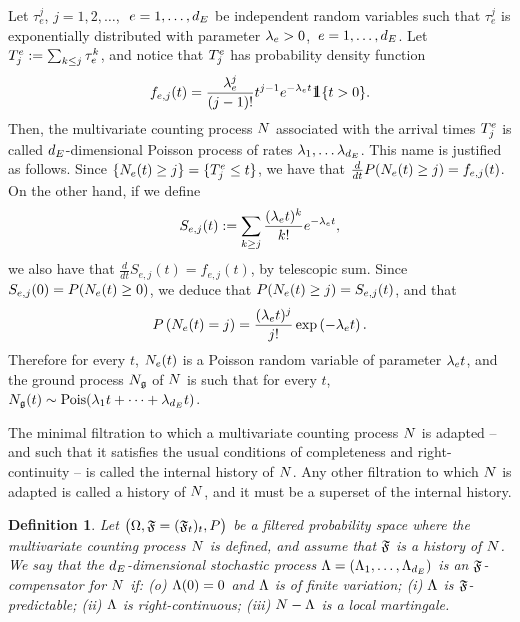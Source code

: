 \documentclass[10pt]{article}
\newtheorem{defi}[thm]{Definition}
\begin{document}
\begin{example}
 Let $\tau_e^j$, $j=1,2,\dots$, $\, \, e=1,\dots, \numEventTypes$ be independent random variables such that $\tau_e^j$ is exponentially distributed with parameter $\intensity>0$, $\, e=1,\dots, \numEventTypes$. Let $\arrivalTimes_{j} := \sum_{k\leq j} \tau_e^{k}$, and notice that $\arrivalTimes_{j}$ has probability density function 
 \begin{equation*}
  f_{e,j}(t) = \frac{\intensity^j}{(j-1)!}t^{j-1} e^{-\intensity t} \one\lbrace t>0\rbrace.
 \end{equation*}
 Then, the multivariate counting process $\multiCountingProc$ associated with the arrival times $\arrivalTimes_{j}$ is called $\numEventTypes$-dimensional Poisson process of rates $\intensity[1], \dots \intensity[\numEventTypes]$. This name is justified as follows. 
 Since $\lbrace \countingProc(t)\geq j\rbrace = \lbrace \arrivalTimes_{j} \leq t\rbrace$, we have that $\frac{d}{dt} \Prob(\countingProc(t) \geq j) = f_{e,j} (t)$. On the other hand, if we define 
 \begin{equation*}
  S_{e,j}(t) := \sum_{k\geq j} \frac{(\intensity t)^k}{k!}e^{-\intensity t},
 \end{equation*}
we also have that $\frac{d}{dt} S_{e,j}(t) = f_{e,j}(t)$, by telescopic sum. Since $S_{e,j}(0) = \Prob (\countingProc(t)\geq 0)$, we deduce that $\Prob(\countingProc(t) \geq j) = S_{e,j}(t)$, and that
\begin{equation*}
 \Prob\left( \countingProc(t) = j\right) = 
 \frac{(\intensity t)^j}{j!} \exp\left( -\intensity t\right).
\end{equation*}
Therefore for every $t$, $\countingProc(t)$ is a Poisson random variable of parameter $\intensity t$, and the ground process $\groundProc$ of $\multiCountingProc$ is such that for every $t$, $\groundProc(t) \sim \text{Pois}(\intensity[1]t + \dots + \intensity[\numEventTypes]t)$.
\end{example}

The minimal filtration to which a multivariate counting process $\multiCountingProc$ is adapted -- and such that it satisfies the usual conditions of completeness and right-continuity -- is called the internal history of $\multiCountingProc$. Any other filtration to which $\multiCountingProc$ is adapted is called a history of $\multiCountingProc$, and it must be a superset of the internal history. 

\begin{defi}\label{def.compensator}
 Let $\stochasticBase$ be a filtered probability space where the multivariate counting process $\multiCountingProc$ is defined, and assume that $\filtrationF$ is a history of $\multiCountingProc$. We say that the $\numEventTypes$-dimensional stochastic process $\compensator = (\compensator_1, \dots , \compensator_{\numEventTypes})$ is an $\filtrationF$-compensator for $\multiCountingProc$ if: (o) $\compensator(0)=0$ and $\compensator$ is of finite variation; (i) $\compensator$ is $\filtrationF$-predictable; (ii) $\compensator$ is right-continuous; (iii) $\multiCountingProc - \compensator$ is a local martingale. 
\end{defi}
\end{document}
